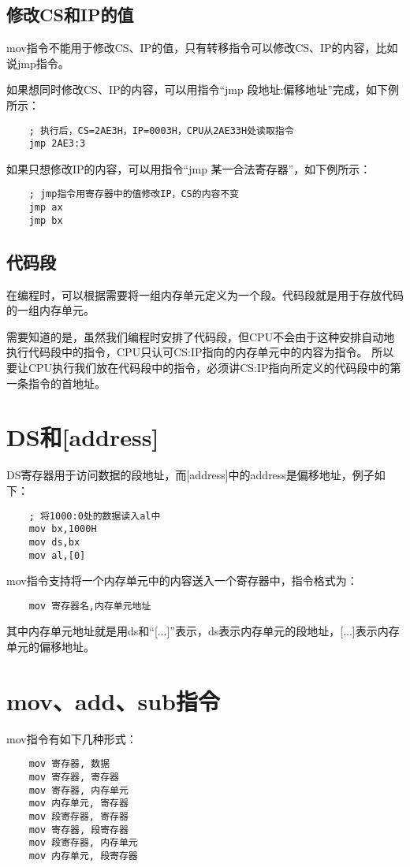 \documentclass[a4paper,left=2.5cm,right=2.5cm,11pt]{article}
\begin{document}
\subsection{修改CS和IP的值}
	mov指令不能用于修改CS、IP的值，只有转移指令可以修改CS、IP的内容，比如说jmp指令。\par

	如果想同时修改CS、IP的内容，可以用指令“jmp 段地址:偏移地址”完成，如下例所示：
	\begin{lstlisting}
	; 执行后，CS=2AE3H，IP=0003H，CPU从2AE33H处读取指令
	jmp 2AE3:3
	\end{lstlisting}

	如果只想修改IP的内容，可以用指令“jmp 某一合法寄存器”，如下例所示：
	\begin{lstlisting}
	; jmp指令用寄存器中的值修改IP，CS的内容不变
	jmp ax
	jmp bx
	\end{lstlisting}

\subsection{代码段}
	在编程时，可以根据需要将一组内存单元定义为一个段。代码段就是用于存放代码的一组内存单元。\par

	需要知道的是，虽然我们编程时安排了代码段，但CPU不会由于这种安排自动地执行代码段中的指令，CPU只认可CS:IP指向的内存单元中的内容为指令。
	所以要让CPU执行我们放在代码段中的指令，必须讲CS:IP指向所定义的代码段中的第一条指令的首地址。

\section{DS和[address]}
	DS寄存器用于访问数据的段地址，而[address]中的address是偏移地址，例子如下：
	\begin{lstlisting}
	; 将1000:0处的数据读入al中
	mov bx,1000H
	mov ds,bx
	mov al,[0]
	\end{lstlisting}

	mov指令支持将一个内存单元中的内容送入一个寄存器中，指令格式为：
	\begin{lstlisting}
	mov 寄存器名,内存单元地址
	\end{lstlisting}

	其中内存单元地址就是用ds和“[...]”表示，ds表示内存单元的段地址，[...]表示内存单元的偏移地址。

\section{mov、add、sub指令}
	mov指令有如下几种形式：
	\begin{lstlisting}
	mov 寄存器, 数据
	mov 寄存器, 寄存器
	mov 寄存器, 内存单元
	mov 内存单元, 寄存器
	mov 段寄存器, 寄存器
	mov 寄存器, 段寄存器
	mov 段寄存器, 内存单元
	mov 内存单元, 段寄存器
	\end{lstlisting}
\end{document}
